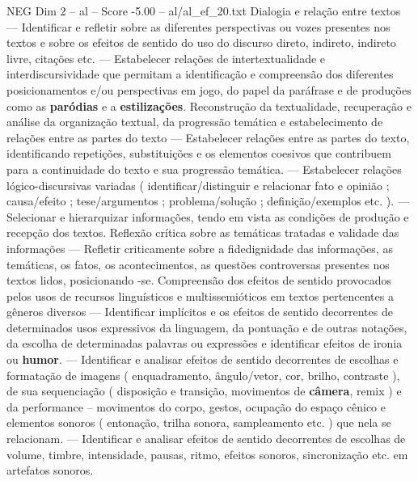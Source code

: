 \begin{textsample}{NEG Dim 2 – al – Score -5.00 – al/al\_ef\_20.txt}
Dialogia e relação entre textos — Identificar e refletir sobre as diferentes perspectivas ou vozes presentes nos textos e sobre os efeitos de sentido do uso do discurso direto, indireto, indireto livre, citações etc. — Estabelecer relações de intertextualidade e interdiscursividade que permitam a identificação e compreensão dos diferentes posicionamentos e/ou perspectivas em jogo, do papel da paráfrase e de produções como as \textbf{paródias} e a \textbf{estilizações}.
Reconstrução da textualidade, recuperação e análise da organização textual, da progressão temática e estabelecimento de relações entre as partes do texto — Estabelecer relações entre as partes do texto, identificando repetições, substituições e os elementos coesivos que contribuem para a continuidade do texto e sua progressão temática. — Estabelecer relações lógico-discursivas variadas ( identificar/distinguir e relacionar fato e opinião ; causa/efeito ; tese/argumentos ; problema/solução ; definição/exemplos etc. ). — Selecionar e hierarquizar informações, tendo em vista as condições de produção e recepção dos textos.
Reflexão crítica sobre as temáticas tratadas e validade das informações — Refletir criticamente sobre a fidedignidade das informações, as temáticas, os fatos, os acontecimentos, as questões controversas presentes nos textos lidos, posicionando -se.
Compreensão dos efeitos de sentido provocados pelos usos de recursos linguísticos e multissemióticos em textos pertencentes a gêneros diversos — Identificar implícitos e os efeitos de sentido decorrentes de determinados usos expressivos da linguagem, da pontuação e de outras notações, da escolha de determinadas palavras ou expressões e identificar efeitos de ironia ou \textbf{humor}. — Identificar e analisar efeitos de sentido decorrentes de escolhas e formatação de imagens ( enquadramento, ângulo/vetor, cor, brilho, contraste ), de sua sequenciação ( disposição e transição, movimentos de \textbf{câmera}, remix ) e da performance – movimentos do corpo, gestos, ocupação do espaço cênico e elementos sonoros ( entonação, trilha sonora, sampleamento etc. ) que nela se relacionam. — Identificar e analisar efeitos de sentido decorrentes de escolhas de volume, timbre, intensidade, pausas, ritmo, efeitos sonoros, sincronização etc. em artefatos sonoros.

\end{textsample}
